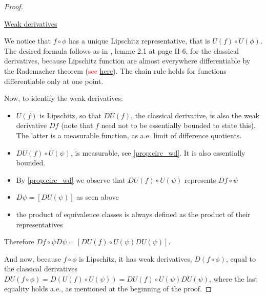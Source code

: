 \documentclass[english,a4paper,12pt,oneside]{scrbook}
\theoremstyle{break}
\newenvironment{mproof}[1][\proofname]{%
  \begin{proof}[#1]$ $\par\nobreak\ignorespaces
}{%
  \end{proof}
}
\renewcommand*{\proofname}{Proof}
\theoremstyle{remark}
\newcommand{\mR}{\mathbb{R}}
\newcommand{\tred}[1]{\textcolor{red}{#1}}
\begin{document}
\begin{mproof}

\underline{Weak derivatives}

We notice that $f \circ \phi$ has a unique Lipschitz representative, that is $U(f)\circ U(\phi)$. The desired formula follows as in \cite{murat}, lemme 2.1 at page II-6, for the classical derivatives, because Lipschitz function are almost everywhere differentiable by the Rademacher theorem (\tred{see \href{https://abel.math.harvard.edu/archive/212b_spring_05/handouts/Rademacher.pdf}{here}}). The chain rule holds for functions differentiable only at one point. 


Now, to identify the weak derivatives:

\begin{itemize}
	\item $U(f)$ is Lipschitz, so that $DU(f)$, the classical derivative, is also the weak derivative $Df$ (note that $f$ need not to be essentially bounded to state this). The latter is a measurable function, as a.e. limit of difference quotients.
	\item $DU(f)\circ U(\psi)$, is measurable, see \cref{prop:circ_wd}. It is also essentially bounded.
	\item By \cref{prop:circ_wd} we observe that $DU(f)\circ U(\psi)$ represents $Df \circ \psi$
	\item $D\psi = [DU(\psi)]$ as seen above
	\item the product of equivalence classes is always defined as the product of their representatives
\end{itemize}

Therefore $ Df \circ \psi D\psi = [DU(f)\circ U(\psi) DU(\psi)]$.

And now, because $f \circ \phi$ is Lipschitz, it has weak derivatives, $D(f \circ \phi)$, equal to the classical derivatives $DU(f\circ \phi) = D (U(f)\circ U(\psi)) = DU(f)\circ U(\psi) DU(\psi)$, where the last equality holds a.e., as mentioned at the beginning of the proof.


\end{mproof}
\end{document}
